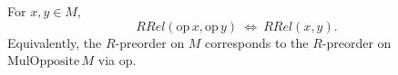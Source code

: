 \begin{lemma}
\label{lem:RRel-op-iff}
For \(x,y\in M\),
\[
  RRel(\mathrm{op}\,x,\mathrm{op}\,y)\ \iff\ RRel(x,y).
\]
Equivalently, the \(R\)-preorder on \(M\) corresponds to the \(R\)-preorder on
\(\mathrm{MulOpposite}\,M\) via \(\mathrm{op}\).
\leanok
{}
\end{lemma}



